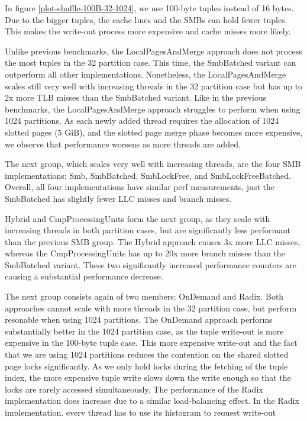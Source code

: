 In figure \ref{plot-shuffle-100B-32-1024}, we use 100-byte tuples instead of 16 bytes.
Due to the bigger tuples, the cache lines and the \acp{SMB} can hold fewer tuples.
This makes the write-out process more expensive and cache misses more likely.

Unlike previous benchmarks, the LocalPagesAndMerge approach does not process the most tuples in the 32 partition case.
This time, the SmbBatched variant can outperform all other implementations.
Nonetheless, the LocalPagesAndMerge scales still very well with increasing threads in the 32 partition case but has up to 2x more \ac{TLB} misses than the SmbBatched variant.
Like in the previous benchmarks, the LocalPagesAndMerge approach struggles to perform when using 1024 partitions.
As each newly added thread requires the allocation of 1024 slotted pages (5 GiB), and the slotted page merge phase becomes more expensive, we observe that performance worsens as more threads are added.

The next group, which scales very well with increasing threads, are the four \ac{SMB} implementations: Smb, SmbBatched, SmbLockFree, and SmbLockFreeBatched.
Overall, all four implementations have similar perf measurements, just the SmbBatched has slightly fewer \ac{LLC} misses and branch misses.

Hybrid and CmpProcessingUnits form the next group, as they scale with increasing threads in both partition cases, but are significantly less performant than the previous \ac{SMB} group.
The Hybrid approach causes 3x more \ac{LLC} misses, whereas the CmpProcessingUnits has up to 20x more branch misses than the SmbBatched variant.
These two significantly increased performance counters are causing a substantial performance decrease.

The next group consists again of two members: OnDemand and Radix.
Both approaches cannot scale with more threads in the 32 partition case, but perform resonable when using 1024 partitions.
The OnDemand approach performs substantially better in the 1024 partition case, as the tuple write-out is more expensive in the 100-byte tuple case.
This more expensive write-out and the fact that we are using 1024 partitions reduces the contention on the shared slotted page locks significantly.
As we only hold locks during the fetching of the tuple index, the more expensive tuple write slows down the write enough so that the locks are rarely accessed simultaneously.
The performance of the Radix implementation does increase due to a similar load-balancing effect.
In the Radix implementation, every thread has to use its histogram to request write-out locations.
We use a lock for each partition to make the implementation more scalable.
We have to hold the lock during the allocation of a slotted page, as it will frequently be the case that the following thread wants to request a write-out location on this newly allocated page.
By increasing the partitions, these locks are load-balanced as each thread starts at a different start partition and then requests a memory location for each partition.

